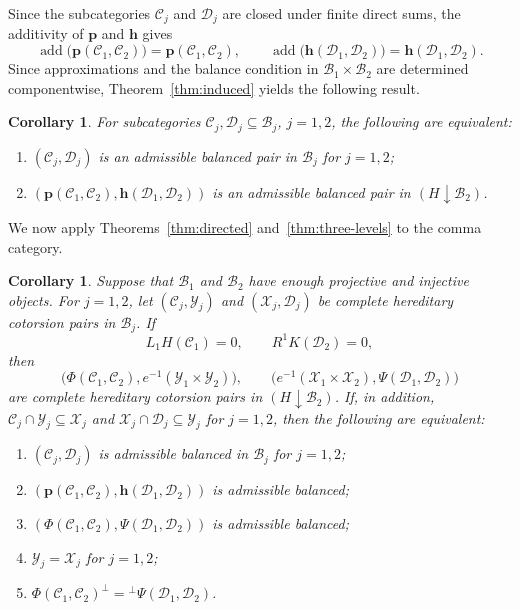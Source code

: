 \documentclass[11pt]{amsart}
\newtheorem{corollary}[theorem]{Corollary}
\theoremstyle{definition}
\theoremstyle{remark}
\theoremstyle{plain}
\numberwithin{equation}{section}
\begin{document}
Since the subcategories $\mathcal{C}_j$ and $\mathcal{D}_j$ are closed under finite direct sums, the additivity of $\mathbf p$ and $\mathbf h$ gives
\[
\operatorname{add}\bigl(\mathbf p(\mathcal{C}_1,\mathcal{C}_2)\bigr)
=\mathbf p(\mathcal{C}_1,\mathcal{C}_2),
\qquad
\operatorname{add}\bigl(\mathbf h(\mathcal{D}_1,\mathcal{D}_2)\bigr)
=\mathbf h(\mathcal{D}_1,\mathcal{D}_2).
\]
Since approximations and the balance condition in
$\mathcal{B}_1\times\mathcal{B}_2$ are determined componentwise, Theorem~\ref{thm:induced} yields the following result.
\begin{corollary}\label{cor:comma-induced}
For subcategories $\mathcal{C}_j, \mathcal{D}_j \subseteq \mathcal{B}_j$, $j = 1, 2$, the following are
equivalent:
\begin{enumerate}
 \item $(\mathcal{C}_j, \mathcal{D}_j)$ is an admissible balanced pair in $\mathcal{B}_j$ for
 $j = 1, 2$;
 \item $(\mathbf p(\mathcal{C}_1, \mathcal{C}_2), \mathbf h(\mathcal{D}_1, \mathcal{D}_2))$ is an admissible
 balanced pair in $(H \downarrow \mathcal{B}_2)$.
\end{enumerate}
\end{corollary}

We now apply Theorems~\ref{thm:directed} and~\ref{thm:three-levels} to the comma category.
\begin{corollary}\label{cor:comma}
Suppose that $\mathcal{B}_1$ and $\mathcal{B}_2$ have enough projective and injective objects. For $j = 1, 2$, let $(\mathcal{C}_j, \mathcal{Y}_j)$ and $(\mathcal{X}_j, \mathcal{D}_j)$ be complete
hereditary cotorsion pairs in $\mathcal{B}_j$. If
\begin{equation}\label{eq:comma-relative}
 L_1H(\mathcal{C}_1) = 0, \qquad R^1K(\mathcal{D}_2) = 0,
\end{equation}
then
\[
 \bigl(\Phi(\mathcal{C}_1, \mathcal{C}_2), e^{-1}(\mathcal{Y}_1 \times \mathcal{Y}_2)\bigr), \qquad
 \bigl(e^{-1}(\mathcal{X}_1 \times \mathcal{X}_2), \Psi(\mathcal{D}_1, \mathcal{D}_2)\bigr)
\]
are complete hereditary cotorsion pairs in $(H\downarrow\mathcal{B}_2)$. If, in addition,
$\mathcal{C}_j \cap \mathcal{Y}_j \subseteq \mathcal{X}_j$ and $\mathcal{X}_j \cap \mathcal{D}_j \subseteq \mathcal{Y}_j$ for $j = 1, 2$, then the following are equivalent:
\begin{enumerate}
 \item $(\mathcal{C}_j, \mathcal{D}_j)$ is admissible balanced in $\mathcal{B}_j$ for $j = 1, 2$;
 \item $(\mathbf p(\mathcal{C}_1, \mathcal{C}_2), \mathbf h(\mathcal{D}_1, \mathcal{D}_2))$ is
 admissible balanced;
 \item $(\Phi(\mathcal{C}_1, \mathcal{C}_2), \Psi(\mathcal{D}_1, \mathcal{D}_2))$ is admissible balanced;
 \item $\mathcal{Y}_j = \mathcal{X}_j$ for $j = 1, 2$;
 \item $\Phi(\mathcal{C}_1, \mathcal{C}_2)^\perp = {}^\perp\Psi(\mathcal{D}_1, \mathcal{D}_2)$.
\end{enumerate}
\end{corollary}
\end{document}
